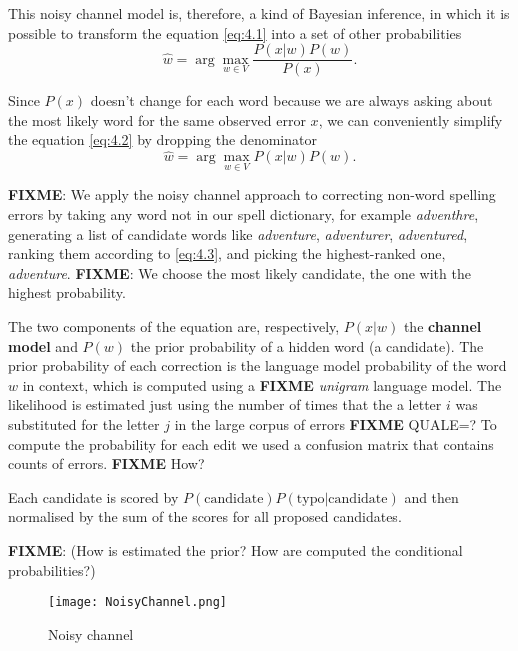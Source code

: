 This noisy channel model is, therefore, a kind of Bayesian inference, in which it is possible to transform the 
equation 
\ref{eq:4.1} into a set of other probabilities
\begin{equation}\label{eq:4.2}
\hat{w} = \arg\max_{w \in V} \frac{P(x|w)P(w)}{P(x)} \mbox{.}
\end{equation}

Since $P(x)$ doesn’t change for each word because we are always asking about the most likely word for the same 
observed error $x$, we can conveniently simplify the equation \ref{eq:4.2} by dropping the denominator
\begin{equation}\label{eq:4.3}
\hat{w} = \arg\max_{w \in V} {P(x|w)P(w)} \mbox{.}
\end{equation}

\textbf{FIXME}: We apply the noisy channel approach to correcting non-word spelling errors by taking any word not 
in our 
spell dictionary, for example \textsl{adventhre}, generating a list of candidate words like \textsl{adventure}, 
\textsl{adventurer}, \textsl{adventured}, ranking them according to \ref{eq:4.3}, and picking the highest-ranked 
one, 
\textsl{adventure}. \textbf{FIXME}: We choose the most likely candidate, the one with the highest probability.

The two components of the equation are, respectively, $P(x|w)$ the \textbf{channel model} and $P(w)$ the prior 
probability of a hidden word (a candidate).
The prior probability of each correction is the language model probability of the word $w$ in context, which is 
computed using a \textbf{FIXME} \textit{unigram} language model. 
The likelihood is estimated just using the number of times that the a letter $i$ was substituted for the letter $j$ in 
the large corpus of errors \textbf{FIXME} QUALE=? 
To compute the probability for each edit we used a confusion matrix that contains counts of errors. \textbf{FIXME} 
How? 



Each candidate is scored by $P(\mbox{candidate})P(\mbox{typo}|\mbox{candidate})$ and then normalised by the 
sum of the scores for all proposed candidates.

\textbf{FIXME}:  (How is estimated the prior? How are computed the conditional probabilities?)

\begin{figure}[H]
	\centering
	\texttt{[image: NoisyChannel.png]}
	\caption{Noisy channel}
	\label{fig:noisychannel}
\end{figure}

